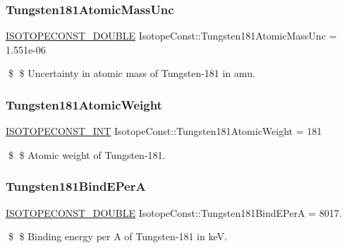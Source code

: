 \subsubsection{\texorpdfstring{Tungsten181\+Atomic\+Mass\+Unc}{Tungsten181AtomicMassUnc}}
{\footnotesize\ttfamily \mbox{\hyperlink{group___isotope_const-_macros_ga8f45a7272ce02c0b4c65c44636ed719a}{I\+S\+O\+T\+O\+P\+E\+C\+O\+N\+S\+T\+\_\+\+D\+O\+U\+B\+LE}} Isotope\+Const\+::\+Tungsten181\+Atomic\+Mass\+Unc = 1.\+551e-\/06}

\$ \$ Uncertainty in atomic mass of Tungsten-\/181 in amu. \mbox{\label{group___isotope_const-_tungsten-_w181_gaf8ee6fce0ddf663d53826edbba492da0}} 
\subsubsection{\texorpdfstring{Tungsten181\+Atomic\+Weight}{Tungsten181AtomicWeight}}
{\footnotesize\ttfamily \mbox{\hyperlink{group___isotope_const-_macros_ga5f18360b3e99483a35c32d789e62621c}{I\+S\+O\+T\+O\+P\+E\+C\+O\+N\+S\+T\+\_\+\+I\+NT}} Isotope\+Const\+::\+Tungsten181\+Atomic\+Weight = 181}

\$ \$ Atomic weight of Tungsten-\/181. \mbox{\label{group___isotope_const-_tungsten-_w181_ga874b22fe60e7836d49a97e643b9f2215}} 
\subsubsection{\texorpdfstring{Tungsten181\+Bind\+E\+PerA}{Tungsten181BindEPerA}}
{\footnotesize\ttfamily \mbox{\hyperlink{group___isotope_const-_macros_ga8f45a7272ce02c0b4c65c44636ed719a}{I\+S\+O\+T\+O\+P\+E\+C\+O\+N\+S\+T\+\_\+\+D\+O\+U\+B\+LE}} Isotope\+Const\+::\+Tungsten181\+Bind\+E\+PerA = 8017.}

\$ \$ Binding energy per A of Tungsten-\/181 in keV. \mbox{\label{group___isotope_const-_tungsten-_w181_gafd1ee7f9ce240315a3fb393315492145}} 

